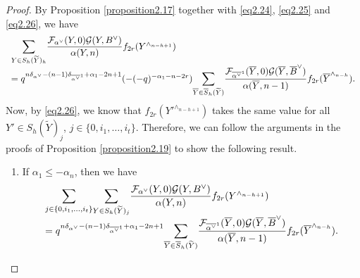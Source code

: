 \documentclass[11pt,oneside]{amsart}
\theoremstyle{plain}
\theoremstyle{definition}
\theoremstyle{remark}
\newcommand{\CF}{{\mathcal F}}
\newcommand{\CG}{{\mathcal G}}
\numberwithin{equation}{section}
\begin{document}
\begin{proof}
		By Proposition \ref{proposition2.17} together with \eqref{eq2.24}, \eqref{eq2.25} and \eqref{eq2.26}, we have
		\begin{equation}\label{eq2.27}
			\begin{array}{l}
				\mathlarger{\sum}_{Y \in S_h(\widetilde{Y})_{h}}	\dfrac{\CF_{\alpha^{\vee}}(Y,0)\CG(Y,B^{\vee})}{\alpha(Y,n)}f_{2r}(Y^{\wedge_{n-h+1}})\\
				=q^{n\delta_{\alpha^{\vee}}-(n-1)\delta_{\overline{\alpha^{\vee}}^1}+\alpha_1-2n+1}(-(-q)^{-\alpha_1-n-2r})\mathlarger{\sum}_{\overline{Y} \in \overline{S}_h(\widetilde{Y})}\dfrac{\CF_{\overline{\alpha^{\vee}}^1}(\overline{Y},0)\CG(\overline{Y},\overline{B}^{\vee})}{\alpha(\overline{Y},n-1)}f_{2r}(\overline{Y}^{\wedge_{n-h}}).
			\end{array}
		\end{equation}
		Now, by \eqref{eq2.26}, we know that $f_{2r}(Y'^{\wedge_{n-h+1}})$ takes the same value for all $Y' \in S_h(\widetilde{Y})_j$, $j \in \lbrace 0,i_1,\dots,i_t\rbrace$. Therefore, we can follow the arguments in the proofs of Proposition \ref{proposition2.19} to show the following result.
		
		\begin{enumerate}
			\item If $\alpha_1 \leq -\alpha_{n}$, then we have
			\begin{equation*}\begin{array}{l}
					\mathlarger{\sum}_{j \in \lbrace 0,i_1,\dots,i_t \rbrace}\mathlarger{\sum}_{Y \in S_h(\widetilde{Y})_{j}}	\dfrac{\CF_{\alpha^{\vee}}(Y,0)\CG(Y,B^{\vee})}{\alpha(Y,n)}f_{2r}(Y^{\wedge_{n-h+1}})\\
					=q^{n\delta_{\alpha^{\vee}}-(n-1)\delta_{\overline{\alpha^{\vee}}^1}+\alpha_1-2n+1}\mathlarger{\sum}_{\overline{Y} \in \overline{S}_h(\widetilde{Y})}\dfrac{\CF_{\overline{\alpha^{\vee}}^1}(\overline{Y},0)\CG(\overline{Y},\overline{B}^{\vee})}{\alpha(\overline{Y},n-1)}f_{2r}(\overline{Y}^{\wedge_{n-h}}).
				\end{array}
			\end{equation*}
			

\end{enumerate}
\end{proof}
\end{document}

